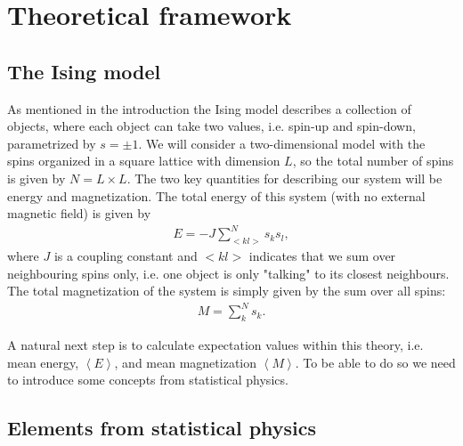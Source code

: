 \documentclass[12pt, a4paper]{article}
\begin{document}
\section{Theoretical framework}

\subsection{The Ising model}

As mentioned in the introduction the Ising model describes a collection of objects, where each object 
can take two values, i.e. spin-up and spin-down, parametrized by $s=\pm 1$. We will consider a 
two-dimensional model with the spins organized in a square lattice with dimension $L$, so the total 
number of spins is given by $N = L\times L$. The two key quantities for describing our system 
will be energy and magnetization. The total energy of this system (with no external magnetic field) 
is given by 
\begin{align}
E = -J\sum_{<kl>}^{N} s_k s_l, 
\end{align}
where $J$ is a coupling constant and $<kl>$ indicates that we sum over neighbouring spins only, i.e. 
one object is only "talking" to its closest neighbours. The total magnetization of the system is simply 
given by the sum over all spins: 
\begin{align} 
M = \sum_k^N s_k. 
\end{align}

A natural next step is to calculate expectation values within this theory, i.e. mean energy, 
$\left\langle E \right\rangle$, and mean magnetization $\left\langle M \right\rangle$. To be able to do 
so we need to introduce some concepts from statistical physics.  

\subsection{Elements from statistical physics}
\end{document}
